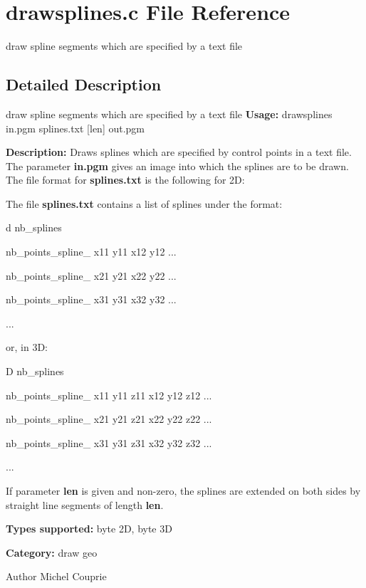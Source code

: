 \section{drawsplines.c File Reference}
\label{drawsplines_8c}


draw spline segments which are specified by a text file  




\subsection{Detailed Description}
draw spline segments which are specified by a text file {\bfseries Usage:} drawsplines in.pgm splines.txt [len] out.pgm

{\bfseries Description:} Draws splines which are specified by control points in a text file. The parameter {\bfseries in.pgm} gives an image into which the splines are to be drawn. The file format for {\bfseries splines.txt} is the following for 2D:

The file {\bfseries splines.txt} contains a list of splines under the format:\par
 d nb\_\-splines\par
 nb\_\-points\_\-spline\_ x11 y11 x12 y12 ...\par
 nb\_\-points\_\-spline\_ x21 y21 x22 y22 ...\par
 nb\_\-points\_\-spline\_ x31 y31 x32 y32 ...\par
 ...\par
 or, in 3D:\par
 D nb\_\-splines\par
 nb\_\-points\_\-spline\_ x11 y11 z11 x12 y12 z12 ...\par
 nb\_\-points\_\-spline\_ x21 y21 z21 x22 y22 z22 ...\par
 nb\_\-points\_\-spline\_ x31 y31 z31 x32 y32 z32 ...\par
 ...\par


If parameter {\bfseries len} is given and non-\/zero, the splines are extended on both sides by straight line segments of length {\bfseries len}.

{\bfseries Types supported:} byte 2D, byte 3D

{\bfseries Category:} draw geo

\begin{DoxyAuthor}{Author}
Michel Couprie 
\end{DoxyAuthor}
